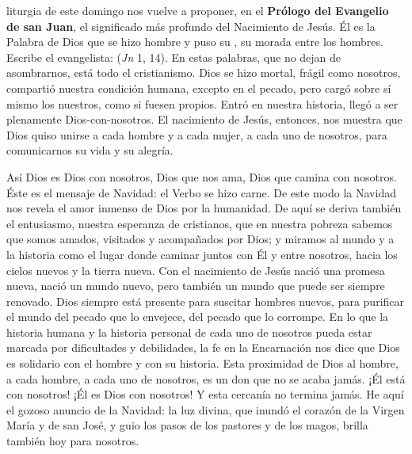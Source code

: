 
\begin{body}
	 liturgia de este domingo nos vuelve a proponer, en el \textbf{Prólogo del Evangelio de san Juan}, el significado más profundo del Nacimiento de Jesús. Él es la Palabra de Dios que se hizo hombre y puso su , su morada entre los hombres. Escribe el evangelista:  (\emph{Jn} 1, 14). En estas palabras, que no dejan de asombrarnos, está todo el cristianismo. Dios se hizo mortal, frágil como nosotros, compartió nuestra condición humana, excepto en el pecado, pero cargó sobre sí mismo los nuestros, como si fuesen propios. Entró en nuestra historia, llegó a ser plenamente Dios-con-nosotros. El nacimiento de Jesús, entonces, nos muestra que Dios quiso unirse a cada hombre y a cada mujer, a cada uno de nosotros, para comunicarnos su vida y su alegría.
	
	Así Dios es Dios con nosotros, Dios que nos ama, Dios que camina con nosotros. Éste es el mensaje de Navidad: el Verbo se hizo carne. De este modo la Navidad nos revela el amor inmenso de Dios por la humanidad. De aquí se deriva también el entusiasmo, nuestra esperanza de cristianos, que en nuestra pobreza sabemos que somos amados, visitados y acompañados por Dios; y miramos al mundo y a la historia como el lugar donde caminar juntos con Él y entre nosotros, hacia los cielos nuevos y la tierra nueva. Con el nacimiento de Jesús nació una promesa nueva, nació un mundo nuevo, pero también un mundo que puede ser siempre renovado. Dios siempre está presente para suscitar hombres nuevos, para purificar el mundo del pecado que lo envejece, del pecado que lo corrompe. En lo que la historia humana y la historia personal de cada uno de nosotros pueda estar marcada por dificultades y debilidades, la fe en la Encarnación nos dice que Dios es solidario con el hombre y con su historia. Esta proximidad de Dios al hombre, a cada hombre, a cada uno de nosotros, es un don que no se acaba jamás. ¡Él está con nosotros! ¡Él es Dios con nosotros! Y esta cercanía no termina jamás. He aquí el gozoso anuncio de la Navidad: la luz divina, que inundó el corazón de la Virgen María y de san José, y guio los pasos de los pastores y de los magos, brilla también hoy para nosotros.
	

\end{body}
